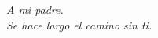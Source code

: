 
\begin{dedication} %
\begin{flushright}
\textit{A mi padre. \\Se hace largo el camino sin ti.}
\end{flushright}




\end{dedication}

